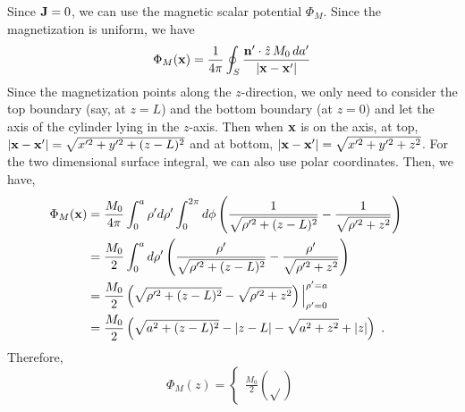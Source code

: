 \documentclass[12pt]{article}
\newcommand{\x}{{\bf x}}
\newcommand{\bJ}{{\bf J}}
\begin{document}
\newpage
{} Since $\bJ = 0$, we can use the magnetic scalar potential $\Phi_M$. Since the magnetization is uniform, we have
\begin{equation}
    \Phi_M(\x) = \frac{1}{4\pi} \oint_S \frac{{\bf n}' \cdot \hat{z}\, M_0 \, da' }{|\x - \x'|}
\end{equation}
Since the magnetization points along the $z$-direction, we only need to consider the top boundary (say, at $z = L$) and the bottom boundary (at $z = 0$) and let the axis of the cylinder lying in the $z$-axis. Then when $\x$ is on the axis, at top, $|\x - \x'| = \sqrt{x'^2 + y'^2 + (z - L)^2}$ and at bottom, $|\x - \x'| = \sqrt{x'^2 + y'^2 + z^2}$. For the two dimensional surface integral, we can also use polar coordinates. Then, we have,
\begin{align}
    \Phi_M(\x) &= \frac{M_0}{4\pi} \int_0^a \rho' d\rho' \int_0^{2\pi} d\phi \left(\frac{1}{\sqrt{\rho'^2 + (z - L)^2}} - \frac{1}{\sqrt{\rho'^2 + z^2}}\right)\cr
    &= \frac{M_0}{2} \int_0^a d\rho' \left(\frac{\rho'}{\sqrt{\rho'^2 + (z - L)^2}} - \frac{\rho'}{\sqrt{\rho'^2 + z^2}}\right)\cr
    &= \frac{M_0}{2} \left(\sqrt{\rho'^2 + (z-L)^2} - \sqrt{\rho'^2 + z^2} \right)\Big|_{\rho' = 0}^{\rho' = a}\cr
    &= \frac{M_0}{2} \left(\sqrt{a^2 + (z-L)^2} - |z - L| - \sqrt{a^2 + z^2} + |z|\right)~.
\end{align}
Therefore,
\begin{equation}
    \Phi_M(z) = \begin{cases}
        \frac{M_0}{2}\left(\sqrt{}\right)
    \end{cases}
\end{equation}

\newpage
{}

\newpage
{}

\newpage
{}

\newpage
{}
\end{document}
